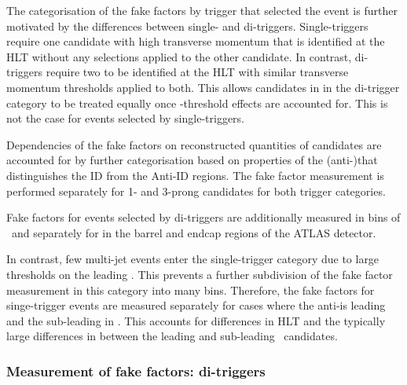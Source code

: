 The categorisation of the fake factors by trigger that selected the
event is further motivated by the differences between single- and
di-\tauhadvis triggers. Single-\tauhadvis triggers require one
\tauhadvis candidate with high transverse momentum that is identified
at the HLT without any selections applied to the other candidate. In
contrast, di-\tauhadvis triggers require two \tauhadvis to be
identified at the HLT with similar transverse momentum thresholds
applied to both. This allows \tauhadvis candidates in in the
di-\tauhadvis trigger category to be treated equally once
\pT-threshold effects are accounted for. This is not the case for
events selected by single-\tauhadvis triggers.

Dependencies of the fake factors on reconstructed quantities of
\tauhadvis candidates are accounted for by further categorisation
based on properties of the (anti-)\tauhadvis that distinguishes the ID
from the Anti-ID regions. The fake factor measurement is performed
separately for 1- and 3-prong \tauhadvis candidates for both trigger
categories.

Fake factors for events selected by di-\tauhadvis triggers are
additionally measured in bins of \tauhadvis~\pT and separately for
\tauhadvis in the barrel and endcap regions of the ATLAS detector.

In contrast, few multi-jet events enter the single-\tauhadvis trigger
category due to large \pT thresholds on the leading \tauhadvis. This
prevents a further subdivision of the fake factor measurement in this
category into many bins. Therefore, the fake factors for
singe-\tauhadvis trigger events are measured separately for cases
where the anti-\tauhadvis is leading and the sub-leading in \pT. This
accounts for differences in HLT \tauid and the typically large
differences in \pT between the leading and sub-leading
\tauhadvis~candidates.

\subsubsection{Measurement of fake factors: di-\tauhadvis triggers}

